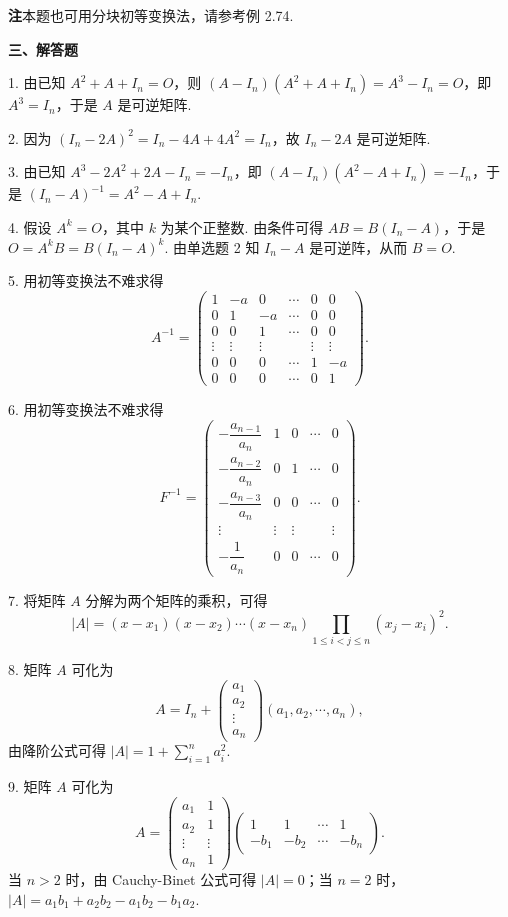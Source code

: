 \documentclass[UTF8,12pt,a4paper,fontset=fandol]{ctexart}
\begin{document}
\noindent\textbf{注}\quad 本题也可用分块初等变换法，请参考例 2.74.

\noindent\textbf{三、解答题}

1. 由已知 $A^2+A+I_n=O$，则 $(A-I_n)(A^2+A+I_n)=A^3-I_n=O$，即 $A^3=I_n$，于是 $A$ 是可逆矩阵.

2. 因为 $(I_n-2A)^2=I_n-4A+4A^2=I_n$，故 $I_n-2A$ 是可逆矩阵.

3. 由已知 $A^3-2A^2+2A-I_n=-I_n$，即 $(A-I_n)(A^2-A+I_n)=-I_n$，于是 $(I_n-A)^{-1}=A^2-A+I_n$.

4. 假设 $A^k=O$，其中 $k$ 为某个正整数. 由条件可得 $AB=B(I_n-A)$，于是 $O=A^kB=B(I_n-A)^k$. 由单选题 2 知 $I_n-A$ 是可逆阵，从而 $B=O$.

5. 用初等变换法不难求得
\[
A^{-1}=
\left(
\begin{array}{rrrrrr}
1 & -a & 0 & \cdots & 0 & 0\\
0 & 1 & -a & \cdots & 0 & 0\\
0 & 0 & 1 & \cdots & 0 & 0\\
\vdots & \vdots & \vdots & & \vdots & \vdots\\
0 & 0 & 0 & \cdots & 1 & -a\\
0 & 0 & 0 & \cdots & 0 & 1
\end{array}
\right).
\]

6. 用初等变换法不难求得
\[
F^{-1}=
\left(
\begin{array}{ccccc}
-\dfrac{a_{n-1}}{a_n} & 1 & 0 & \cdots & 0\\
-\dfrac{a_{n-2}}{a_n} & 0 & 1 & \cdots & 0\\
-\dfrac{a_{n-3}}{a_n} & 0 & 0 & \cdots & 0\\
\vdots & \vdots & \vdots & & \vdots\\
-\dfrac1{a_n} & 0 & 0 & \cdots & 0
\end{array}
\right).
\]

7. 将矩阵 $A$ 分解为两个矩阵的乘积，可得
\[
|A|=(x-x_1)(x-x_2)\cdots(x-x_n)
\prod_{1\le i<j\le n}(x_j-x_i)^2.
\]

8. 矩阵 $A$ 可化为
\[
A=I_n+
\left(
\begin{array}{c}
a_1\\
a_2\\
\vdots\\
a_n
\end{array}
\right)
(a_1,a_2,\cdots,a_n),
\]
由降阶公式可得 $|A|=1+\sum\limits_{i=1}^n a_i^2$.

9. 矩阵 $A$ 可化为
\[
A=
\left(
\begin{array}{cc}
a_1 & 1\\
a_2 & 1\\
\vdots & \vdots\\
a_n & 1
\end{array}
\right)
\left(
\begin{array}{cccc}
1 & 1 & \cdots & 1\\
-b_1 & -b_2 & \cdots & -b_n
\end{array}
\right).
\]
当 $n>2$ 时，由 Cauchy-Binet 公式可得 $|A|=0$；当 $n=2$ 时，$|A|=a_1b_1+a_2b_2-a_1b_2-b_1a_2$.
\end{document}
